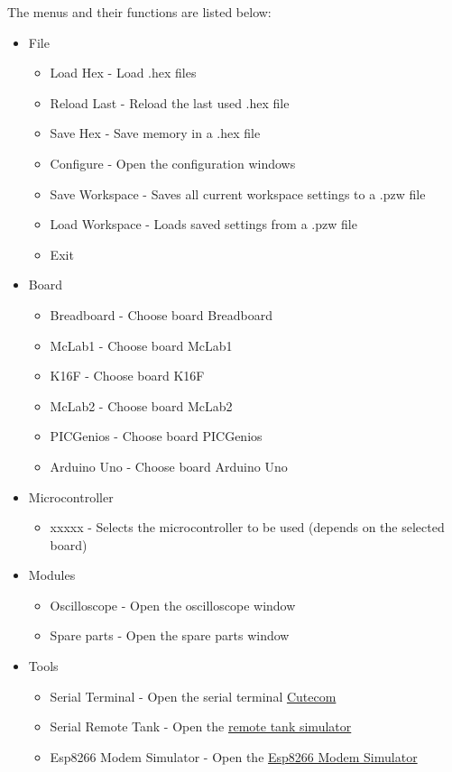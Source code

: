 The menus and their functions are listed below:
\begin{itemize}
\item File
\begin{itemize}
\item Load Hex - Load .hex files
\item Reload Last - Reload the last used .hex file
\item Save Hex - Save memory in a .hex file
\item Configure - Open the configuration windows
\item Save Workspace - Saves all current workspace settings to a .pzw file
\item Load Workspace - Loads saved settings from a .pzw file
\item Exit
\end{itemize}
\item Board
\begin{itemize}
\item Breadboard - Choose board Breadboard
\item McLab1 - Choose board McLab1
\item K16F - Choose board K16F
\item McLab2 - Choose board McLab2
\item PICGenios - Choose board PICGenios
\item Arduino Uno - Choose board Arduino Uno
\end{itemize}
\item Microcontroller
\begin{itemize}
 \item xxxxx - Selects the microcontroller to be used (depends on the selected board)
\end{itemize}
\item Modules
\begin{itemize}
\item Oscilloscope - Open the oscilloscope window
\item Spare parts - Open the spare parts window
\end{itemize}
\item Tools 
\begin{itemize}
 \item Serial Terminal - Open the serial terminal \hyperlink{def:sterm}{Cutecom}
 \item Serial Remote Tank - Open the \hyperlink{def:srtank}{remote tank simulator}
 \item Esp8266 Modem Simulator -  Open the \hyperlink{def:espmsim}{Esp8266 Modem Simulator}

\end{itemize}
\end{itemize}
